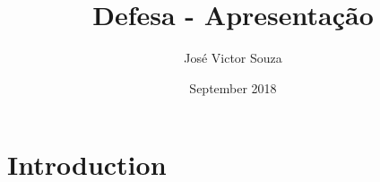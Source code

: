 \documentclass{beamer}
\title{Defesa - Apresentação}
\author{José Victor Souza}
\date{September 2018}
\begin{document}
\maketitle

\section{Introduction}
\end{document}
